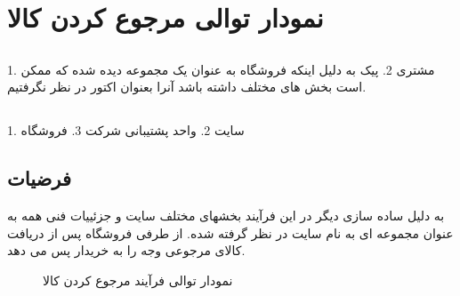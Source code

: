 \documentclass[12pt,onecolumn,a4paper]{article}
\begin{document}
\newpage
\tableofcontents
\newpage
\listoffigures
\newpage


\section{نمودار توالی مرجوع کردن کالا}
\subsection{ } 
1. مشتری
2. پیک
به دلیل اینکه فروشگاه به عنوان یک مجموعه دیده شده که ممکن است بخش های مختلف داشته باشد آنرا بعنوان اکتور در نظر نگرفتیم.

\subsection{ } 
1. سایت
2. واحد پشتیبانی شرکت
3. فروشگاه
\subsection{فرضیات } 

به دلیل ساده سازی دیگر در این فرآیند بخشهای مختلف سایت و جزئییات فنی همه به عنوان مجموعه ای به نام سایت در نظر گرفته شده.
از طرفی فروشگاه پس از دریافت کالای مرجوعی وجه را به خریدار پس می دهد.

\newpage
\begin{figure}[!h]
\caption{نمودار توالی فرآیند مرجوع کردن کالا}\label{figpvb}
\end{figure}
\end{document}
